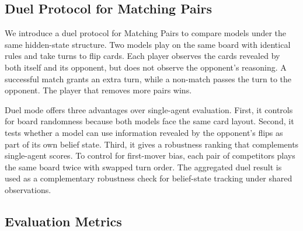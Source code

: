 \documentclass{llmxive}
\begin{document}
\subsection{Duel Protocol for Matching Pairs}
\label{sec:duel_protocol}



We introduce a duel protocol for Matching Pairs to compare models under the same hidden-state structure. Two models play on the same board with identical rules and take turns to flip cards. Each player observes the cards revealed by both itself and its opponent, but does not observe the opponent's reasoning. A successful match grants an extra turn, while a non-match passes the turn to the opponent. The player that removes more pairs wins.

Duel mode offers three advantages over single-agent evaluation. First, it controls for board randomness because both models face the same card layout. Second, it tests whether a model can use information revealed by the opponent's flips as part of its own belief state. Third, it gives a robustness ranking that complements single-agent scores. To control for first-mover bias, each pair of competitors plays the same board twice with swapped turn order. The aggregated duel result is used as a complementary robustness check for belief-state tracking under shared observations.

\subsection{Evaluation Metrics}
\label{sec:metrics}
\end{document}
